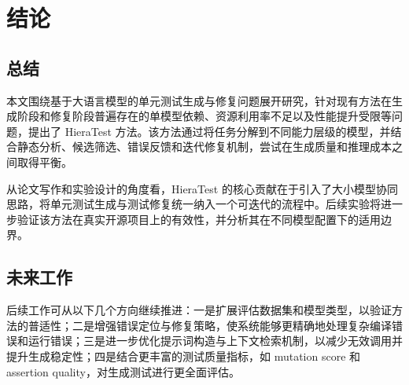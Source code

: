 \cleardoublepage

\section{结论}

\subsection{总结}

本文围绕基于大语言模型的单元测试生成与修复问题展开研究，针对现有方法在生成阶段和修复阶段普遍存在的单模型依赖、资源利用率不足以及性能提升受限等问题，提出了 HieraTest 方法。该方法通过将任务分解到不同能力层级的模型，并结合静态分析、候选筛选、错误反馈和迭代修复机制，尝试在生成质量和推理成本之间取得平衡。

从论文写作和实验设计的角度看，HieraTest 的核心贡献在于引入了大小模型协同思路，将单元测试生成与测试修复统一纳入一个可迭代的流程中。后续实验将进一步验证该方法在真实开源项目上的有效性，并分析其在不同模型配置下的适用边界。

\subsection{未来工作}

后续工作可从以下几个方向继续推进：一是扩展评估数据集和模型类型，以验证方法的普适性；二是增强错误定位与修复策略，使系统能够更精确地处理复杂编译错误和运行错误；三是进一步优化提示词构造与上下文检索机制，以减少无效调用并提升生成稳定性；四是结合更丰富的测试质量指标，如 mutation score 和 assertion quality，对生成测试进行更全面评估。

